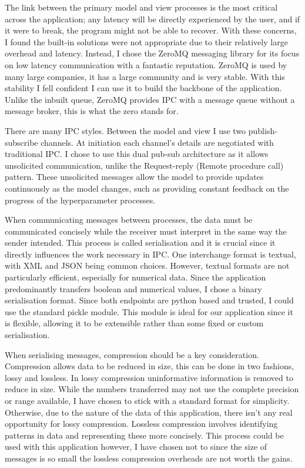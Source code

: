 \documentclass[]{final_report}
\begin{document}
The link between the primary model and view processes is the most critical across the application; any latency will be directly experienced by the user, and if it were to break, the program might not be able to recover. With these concerns, I found the built-in solutions were not appropriate due to their relatively large overhead and latency. Instead, I chose the ZeroMQ messaging library for its focus on low latency communication with a fantastic reputation. ZeroMQ is used by many large companies, it has a large community and is very stable. With this stability I fell confident I can use it to build the backbone of the application. Unlike the inbuilt queue, ZeroMQ provides IPC with a message queue without a message broker, this is what the zero stands for. 

There are many IPC styles. Between the model and view I use two publish-subscribe channels. At initiation each channel's details are negotiated with traditional IPC. I chose to use this dual pub-sub architecture as it allows unsolicited communication, unlike the Request-reply (Remote procedure call) pattern. These unsolicited messages allow the model to provide updates continuously as the model changes, such as providing constant feedback on the progress of the hyperparameter processes. 

When communicating messages between processes, the data must be communicated concisely while the receiver must interpret in the same way the sender intended. This process is called serialisation and it is crucial since it directly influences the work necessary in IPC. One interchange format is textual, with XML and JSON being common choices. However, textual formats are not particularly efficient, especially for numerical data. Since the application predominantly transfers boolean and numerical values, I chose a binary serialisation format. Since both endpoints are python based and trusted, I could use the standard pickle module. This module is ideal for our application since it is flexible, allowing it to be extensible rather than some fixed or custom serialisation. 

When serialising messages, compression should be a key consideration. Compression allows data to be reduced in size, this can be done in two fashions, lossy and lossless. In lossy compression uninformative information is removed to reduce in size. While the numbers transferred may not use the complete precision or range available, I have chosen to stick with a standard format for simplicity. Otherwise, due to the nature of the data of this application, there isn't any real opportunity for lossy compression. Lossless compression involves identifying patterns in data and representing these more concisely. This process could be used with this application however, I have chosen not to since the size of messages is so small the lossless compression overheads are not worth the gains. 
\end{document}
